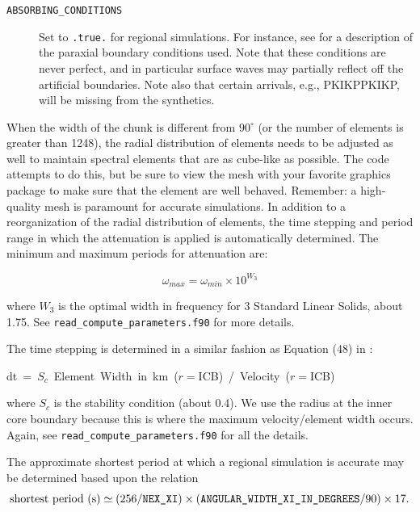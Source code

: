 \documentclass[oneside,english]{book}
\newenvironment{lyxcode}
{\begin{list}{}{
\setlength{\rightmargin}{\leftmargin}
\setlength{\listparindent}{0pt}%
\raggedright
\setlength{\itemsep}{0pt}
\setlength{\parsep}{0pt}
\normalfont\ttfamily}%
 \item[]}
{\end{list}}
\newcommand{\nexxi}{\mbox{\texttt{NEX\_XI}}}
\begin{document}
\begin{description}
\item [{\texttt{ABSORBING\_CONDITIONS}}] Set to \texttt{.true.}{\small{}
}for regional simulations. For instance, see \citet{KoTr99} for a
description of the paraxial boundary conditions used. Note that these
conditions are never perfect, and in particular surface waves may
partially reflect off the artificial boundaries. Note also that certain
arrivals, e.g., PKIKPPKIKP, will be missing from the synthetics.
\end{description}
When the width of the chunk is different from $90^{\circ}$ (or the
number of elements is greater than 1248), the radial distribution
of elements needs to be adjusted as well to maintain spectral elements
that are as cube-like as possible. The code attempts to do this, but
be sure to view the mesh with your favorite graphics package to make
sure that the element are well behaved. Remember: a high-quality mesh is paramount for accurate simulations. In addition to a reorganization of the radial distribution of elements,
the time stepping and period range in which the attenuation is applied
is automatically determined. The minimum and maximum periods for attenuation
are:

\[
\omega_{max}=\omega_{min}\times10^{W_{3}}\]


\noindent where $W_{3}$ is the optimal width in frequency for 3 Standard
Linear Solids, about 1.75. See \texttt{\small read\_compute\_parameters.f90}
for more details.

The time stepping is determined in a similar fashion as Equation (48)
in \citet{KoTr02a}:

\begin{lyxcode}
dt~=~$S_{c}$~Element~Width~in~km~($r=$ICB)~/~Velocity~($r=$ICB)
\end{lyxcode}
where $S_{c}$ is the stability condition (about 0.4). We use the
radius at the inner core boundary because this is where the maximum
velocity/element width occurs. Again, see \texttt{\small read\_compute\_parameters}\texttt{.f90}
for all the details.

The approximate shortest period at which a regional simulation is
accurate may be determined based upon the relation \begin{equation}
\mbox{shortest period (s)}\simeq(256/\nexxi)\times(\texttt{ANGULAR\_WIDTH\_XI\_IN\_DEGREES}/90)\times17.\label{eq:shortest_period_regional}\end{equation}
\end{document}
